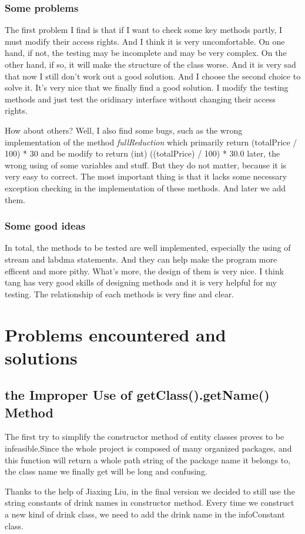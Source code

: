 \documentclass[a4paper]{report}
\begin{document}
\subsection{Some problems}
\par The first problem I find is that if I want to check some key methods partly, I must modify their access rights. And I think it is very uncomfortable. On one hand, if not, the testing may be incomplete and may be very complex. On the other hand, if so, it will make the structure of the class worse. And it is very sad that now I still don't work out a good solution. And I choose the second choice to solve it. It's very nice that we finally find a good solution. I modify the testing methods and just test the oridinary interface without changing their access rights.
\par How about others? Well, I also find some bugs, such as the wrong implementation of the method \emph{fullReduction} which primarily return (totalPrice / 100) * 30 and be modify to return (int) ((totalPrice) / 100) * 30.0 later, the wrong using of some variables and stuff. But they do not matter, because it is very easy to correct. The most important thing is that it lacks some necessary exception checking in the implementation of these methods. And later we add them. 
\subsection{Some good ideas}
\par In total, the methods to be tested are well implemented, especially the using of stream and labdma statements. And they can help make the program more efficent and more pithy. What's more, the design of them is very nice. I think tang has very good skills of designing methods and it is very helpful for my testing. The relationship of each methods is very fine and clear.
\chapter{Problems encountered and solutions}
\section{the Improper Use of getClass().getName() Method}
The first try to simplify the constructor method of entity classes proves to be infeasible.Since the whole project is composed of many organized packages, and this function will return a whole path string of the package name it belongs to, the class name we finally get will be long and confusing.
\par Thanks to the help of Jiaxing Liu, in the final version we decided to still use the string constants of drink names in constructor method. Every time we construct a new kind of drink class, we need to add the drink name in the infoConstant class.
\end{document}
